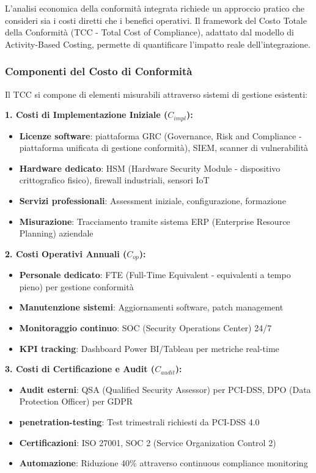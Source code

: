 L'analisi economica della conformità integrata richiede un approccio pratico che consideri sia i costi diretti che i benefici operativi. Il framework del Costo Totale della Conformità (TCC - Total Cost of Compliance), adattato dal modello di Activity-Based Costing\autocite{Kaplan2007}, permette di quantificare l'impatto reale dell'integrazione.

\subsubsection{Componenti del Costo di Conformità}

Il TCC si compone di elementi misurabili attraverso sistemi di gestione esistenti:

\textbf{1. Costi di Implementazione Iniziale ($C_{impl}$):}
\begin{itemize}
    \item \textbf{Licenze software}: piattaforma GRC (Governance, Risk and Compliance - piattaforma unificata di gestione conformità), SIEM, scanner di vulnerabilità
    \item \textbf{Hardware dedicato}: HSM (Hardware Security Module - dispositivo crittografico fisico), firewall industriali, sensori IoT
    \item \textbf{Servizi professionali}: Assessment iniziale, configurazione, formazione
    \item \textbf{Misurazione}: Tracciamento tramite sistema ERP (Enterprise Resource Planning) aziendale
\end{itemize}

\textbf{2. Costi Operativi Annuali ($C_{op}$):}
\begin{itemize}
    \item \textbf{Personale dedicato}: FTE (Full-Time Equivalent - equivalenti a tempo pieno) per gestione conformità
    \item \textbf{Manutenzione sistemi}: Aggiornamenti software, patch management
    \item \textbf{Monitoraggio continuo}: SOC (Security Operations Center) 24/7
    \item \textbf{KPI tracking}: Dashboard Power BI/Tableau per metriche real-time
\end{itemize}

\textbf{3. Costi di Certificazione e Audit ($C_{audit}$):}
\begin{itemize}
    \item \textbf{Audit esterni}: QSA (Qualified Security Assessor) per PCI-DSS, DPO (Data Protection Officer) per GDPR
    \item \textbf{\gls{penetration-testing}}: Test trimestrali richiesti da PCI-DSS 4.0
    \item \textbf{Certificazioni}: ISO 27001, SOC 2 (Service Organization Control 2)
    \item \textbf{Automazione}: Riduzione 40\% attraverso continuous compliance monitoring
\end{itemize}

